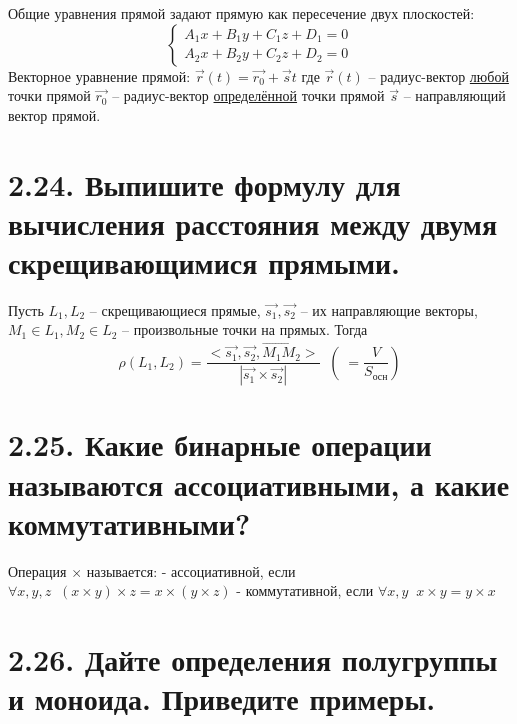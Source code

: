 \documentclass{article}
\begin{document}
Общие уравнения прямой задают прямую как пересечение двух плоскостей:
$$
\begin{cases}
A_1x + B_1y + C_1z + D_1 = 0 \\
A_2x + B_2y + C_2z + D_2 = 0
\end{cases}
$$
Векторное уравнение прямой: $\vec{r}(t) = \vec{r_0} + \vec{s}t$
\newline где $\vec{r}(t)$ -- радиус-вектор \underline{любой} точки прямой
\newline $\vec{r_0}$ -- радиус-вектор \underline{определённой} точки прямой
\newline $\vec{s}$ -- направляющий вектор прямой.

\section*{\LARGE 2.24. Выпишите формулу для вычисления расстояния между двумя скрещивающимися прямыми.  }

Пусть $L_1, L_2$ -- скрещивающиеся прямые, $\vec{s_1}, \vec{s_2}$ -- их направляющие векторы, $M_1 \in L_1, M_2 \in L_2$ -- произвольные точки на прямых. Тогда 
$$
\rho(L_1, L_2) = \frac{<\vec{s_1}, \vec{s_2}, \vec{M_1M_2}>}{|\vec{s_1} \times \vec{s_2}|} \;\; (\;= \frac{V}{S_{\mbox{осн}}})
$$

\section*{\LARGE 2.25. Какие бинарные операции называются ассоциативными, а какие коммутативными?  }

Операция $\times$ называется:
\newline - ассоциативной, если $\forall x,y,z \;\; (x \times y) \times z = x \times (y \times z)$
\newline - коммутативной, если $\forall x,y \;\; x \times y = y \times x$

\section*{\LARGE 2.26. Дайте определения полугруппы и моноида. Приведите примеры. }
\end{document}
